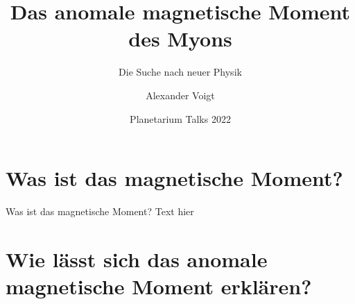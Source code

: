 \documentclass[]{beamer}
\title{Das anomale magnetische Moment des Myons}
\subtitle{Die Suche nach neuer Physik}
\author[Voigt]{Alexander Voigt}
\institute[HS Flensburg]{Hochschule Flensburg}
\date{Planetarium Talks 2022}
\begin{document}

\begin{frame}
  \titlepage
\end{frame}


\section{Was ist das magnetische Moment?}

\begin{frame}{Was ist das magnetische Moment?}
  Text hier
\end{frame}

\section{Wie lässt sich das anomale magnetische Moment erklären?}
\end{document}
